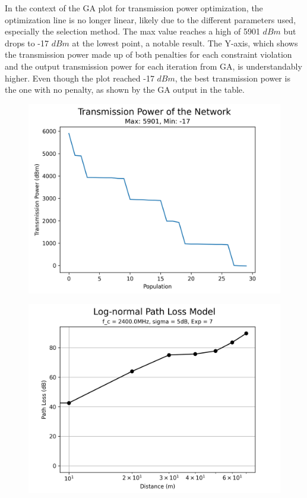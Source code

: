In the context of the GA plot for transmission power optimization, the optimization line is no longer linear, likely due to the different parameters used, especially the selection method. The max value reaches a high of 5901 $dBm$ but drops to -17 $dBm$ at the lowest point, a notable result. The Y-axis, which shows the transmission power made up of both penalties for each constraint violation and the output transmission power for each iteration from GA, is understandably higher. Even though the plot reached -17 $dBm$, the best transmission power is the one with no penalty, as shown by the GA output in the table.

\begin{figure}[H]
  \centering
  \begin{minipage}[t]{0.5\textwidth}
      \centering
      \includegraphics[width=1\linewidth]{images/research_results/genetic_algorithm_different_parameter_power.png}
      \label{fig:genetic_algorithm_different_parameter_power}
  \end{minipage}\hfill
  \begin{minipage}[t]{0.5\textwidth}
      \centering
      \includegraphics[width=1\linewidth]{images/research_results/path-loss-different-parameter.png}

\end{minipage}
\end{figure}
